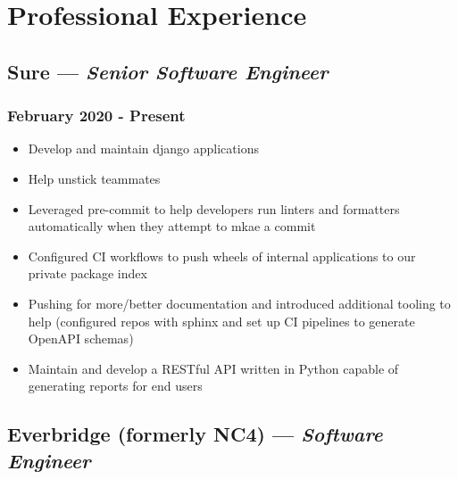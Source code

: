 \documentclass{article}
\begin{document}
\begin{minipage}[t]{.8\textwidth}
\section*{Professional Experience}
\subsection*{Sure  --- \textit{Senior Software Engineer}}
\subsubsection*{February 2020 - Present}
\parbox[t]{.5\textwidth}{\raggedright%
\begin{itemize}
\vspace{-0.5em}
	\item Develop and maintain django applications
	\item Help unstick teammates
	\item Leveraged pre-commit to help developers run linters and formatters automatically when they attempt to mkae a commit
	\item Configured CI workflows to push wheels of internal applications to our private package index
\end{itemize}}
\parbox[t]{.5\textwidth}{\raggedright%
\begin{itemize}
\vspace{-1.5em}
    \item Pushing for more/better documentation and introduced additional tooling to help (configured repos with sphinx and set up CI pipelines to generate OpenAPI schemas)
	\item Maintain and develop a RESTful API written in Python capable of generating reports for end users
\end{itemize}}
\vspace{-1.5em}
\subsection*{Everbridge (formerly NC4) --- \textit{Software Engineer}}

\end{minipage}
\end{document}
